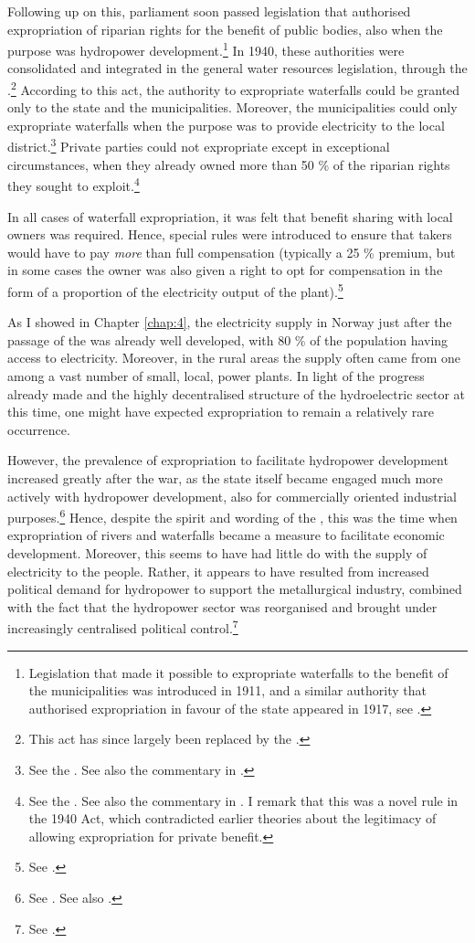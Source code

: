 Following up on this, parliament soon passed legislation that authorised expropriation of riparian rights for the benefit of public bodies, also when the purpose was hydropower development.\footnote{Legislation that made it possible to expropriate waterfalls to the benefit of the municipalities was introduced in 1911, and a similar authority that authorised expropriation in favour of the state appeared in 1917, see \cite[29]{amundsen28}.} In 1940, these authorities were consolidated and integrated in the general water resources legislation, through the \cite{wra40}.\footnote{This act has since largely been replaced by the \cite{wra00}.} According to this act, the authority to expropriate waterfalls could be granted only to the state and the municipalities. Moreover, the municipalities could only expropriate waterfalls when the purpose was to provide electricity to the local district.\footnote{See the \cite[148]{wra40}. See also the commentary in \cite[201-210]{sorensen41}.} Private parties could not expropriate except in exceptional circumstances, when they already owned more than 50 \% of the riparian rights they sought to exploit.\footnote{See the \cite[55]{wra40}. See also the commentary in \cite[70-74]{sorensen41}. I remark that this was a novel rule in the 1940 Act, which contradicted earlier theories about the legitimacy of allowing expropriation for private benefit.} 

In all cases of waterfall expropriation, it was felt that benefit sharing with local owners was required. Hence, special rules were introduced to ensure that takers would have to pay {\it more} than full compensation (typically a 25 \% premium, but in some cases the owner was also given a right to opt for compensation in the form of a proportion of the electricity output of the plant).\footnote{See \cite[70-91,184,210]{sorensen41}.}

As I showed in Chapter \ref{chap:4}, the electricity supply in Norway just after the passage of the \cite{wra40} was already well developed, with 80 \% of the population having access to electricity. Moreover, in the rural areas the supply often came from one among a vast number of small, local, power plants. In light of the progress already made and the highly decentralised structure of the hydroelectric sector at this time, one might have expected expropriation to remain a relatively rare occurrence.

However, the prevalence of expropriation to facilitate hydropower development increased greatly after the war, as the state itself became engaged much more actively with hydropower development, also for commercially oriented industrial purposes.\footnote{See \cite[59-71]{thue96}. See also \cite{skjold06}.} Hence, despite the spirit and wording of the \cite{wra40}, this was the time when expropriation of rivers and waterfalls became a measure to facilitate economic development. Moreover, this seems to have had little do with the supply of electricity to the people. Rather, it appears to have resulted from increased political demand for hydropower to support the metallurgical industry, combined with the fact that the hydropower sector was reorganised and brought under increasingly centralised political control.\footnote{See \cite[69-71]{thue96}.}

